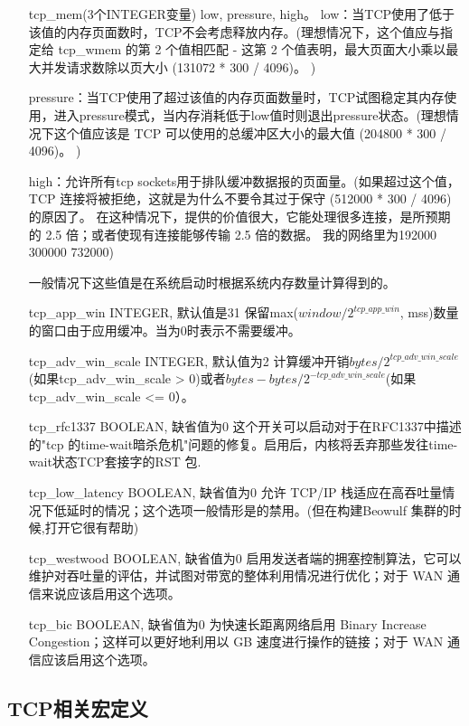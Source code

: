 \begin{enumerate}
\item[tcp\_mem(3个INTEGER变量)] low, pressure, high。
low：当TCP使用了低于该值的内存页面数时，TCP不会考虑释放内存。(理想情况下，这个值应与指定给 tcp\_wmem 的第 2 个值相匹配 - 这第 2 个值表明，最大页面大小乘以最大并发请求数除以页大小 (131072 * 300 / 4096)。 )

pressure：当TCP使用了超过该值的内存页面数量时，TCP试图稳定其内存使用，进入pressure模式，当内存消耗低于low值时则退出pressure状态。(理想情况下这个值应该是 TCP 可以使用的总缓冲区大小的最大值 (204800 * 300 / 4096)。 )

high：允许所有tcp sockets用于排队缓冲数据报的页面量。(如果超过这个值，TCP 连接将被拒绝，这就是为什么不要令其过于保守 (512000 * 300 / 4096) 的原因了。 在这种情况下，提供的价值很大，它能处理很多连接，是所预期的 2.5 倍；或者使现有连接能够传输 2.5 倍的数据。 我的网络里为192000 300000 732000)

一般情况下这些值是在系统启动时根据系统内存数量计算得到的。

\item[tcp\_app\_win] INTEGER,
默认值是31
保留max($window/2^{tcp\_app\_win}$, mss)数量的窗口由于应用缓冲。当为0时表示不需要缓冲。

\item[tcp\_adv\_win\_scale] INTEGER,
默认值为2
计算缓冲开销$bytes/2^{tcp\_adv\_win\_scale}$(如果tcp\_adv\_win\_scale > 0)或者$bytes-bytes/2^{-tcp\_adv\_win\_scale}$(如果tcp\_adv\_win\_scale <= 0）。

\item[tcp\_rfc1337] BOOLEAN,
缺省值为0
这个开关可以启动对于在RFC1337中描述的"tcp 的time-wait暗杀危机"问题的修复。启用后，内核将丢弃那些发往time-wait状态TCP套接字的RST 包.

\item[tcp\_low\_latency]  BOOLEAN,
缺省值为0
允许 TCP/IP 栈适应在高吞吐量情况下低延时的情况；这个选项一般情形是的禁用。(但在构建Beowulf 集群的时候,打开它很有帮助)

\item[tcp\_westwood] BOOLEAN,
缺省值为0
启用发送者端的拥塞控制算法，它可以维护对吞吐量的评估，并试图对带宽的整体利用情况进行优化；对于 WAN 通信来说应该启用这个选项。

\item[tcp\_bic] BOOLEAN,
缺省值为0
为快速长距离网络启用 Binary Increase Congestion；这样可以更好地利用以 GB 速度进行操作的链接；对于 WAN 通信应该启用这个选项。
\end{enumerate}
	\subsection{TCP相关宏定义}
